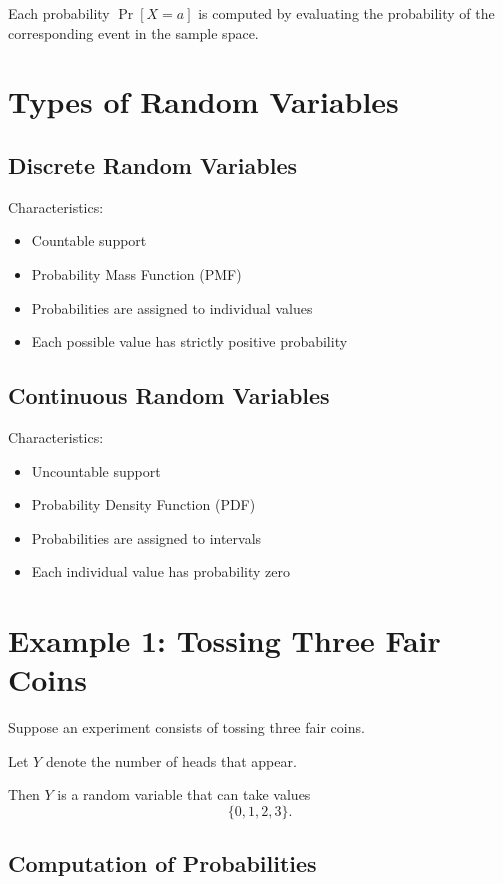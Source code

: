 \documentclass[12pt]{article}
\begin{document}
Each probability $\Pr[X = a]$ is computed by evaluating the probability of the corresponding event in the sample space.

\section{Types of Random Variables}

\subsection{Discrete Random Variables}
Characteristics:
\begin{itemize}
    \item Countable support
    \item Probability Mass Function (PMF)
    \item Probabilities are assigned to individual values
    \item Each possible value has strictly positive probability
\end{itemize}

\subsection{Continuous Random Variables}
Characteristics:
\begin{itemize}
    \item Uncountable support
    \item Probability Density Function (PDF)
    \item Probabilities are assigned to intervals
    \item Each individual value has probability zero
\end{itemize}

\section{Example 1: Tossing Three Fair Coins}

Suppose an experiment consists of tossing three fair coins.

Let $Y$ denote the number of heads that appear.

Then $Y$ is a random variable that can take values
\[
\{0, 1, 2, 3\}.
\]

\subsection*{Computation of Probabilities}
\end{document}
